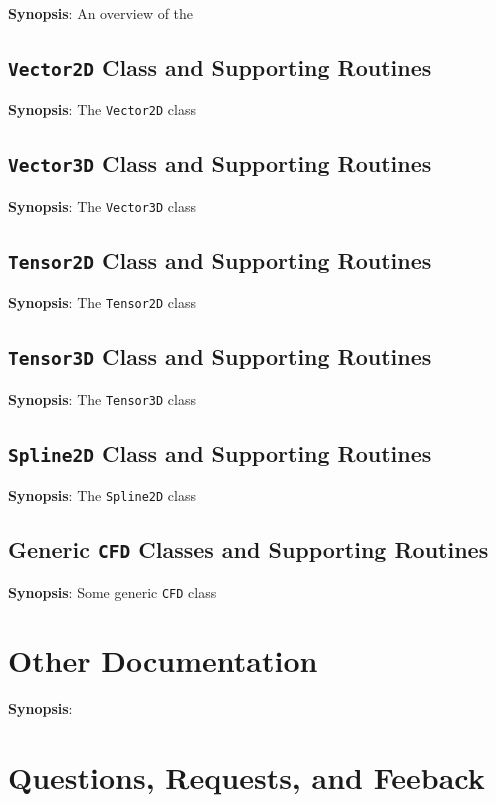 \documentclass[11pt]{report}
\begin{document}
{\bf Synopsis}: An overview of the 

\section{{\tt Vector2D} Class and Supporting Routines}

{\bf Synopsis}: The {\tt Vector2D} class

\section{{\tt Vector3D} Class and Supporting Routines}

{\bf Synopsis}: The {\tt Vector3D} class

\section{{\tt Tensor2D} Class and Supporting Routines}

{\bf Synopsis}: The {\tt Tensor2D} class

\section{{\tt Tensor3D} Class and Supporting Routines}

{\bf Synopsis}: The {\tt Tensor3D} class

\section{{\tt Spline2D} Class and Supporting Routines}

{\bf Synopsis}: The {\tt Spline2D} class

\section{Generic {\tt CFD} Classes and Supporting Routines}

{\bf Synopsis}: Some generic {\tt CFD} class

\chapter{Other Documentation}

{\bf Synopsis}: 

\chapter{Questions, Requests, and Feeback}
\end{document}
